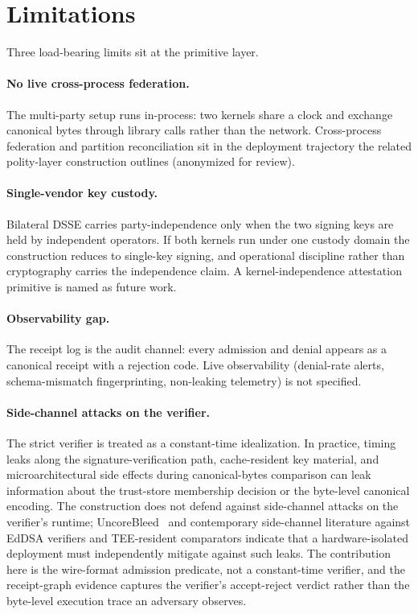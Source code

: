 \section{Limitations}
\label{sec:limits}

Three load-bearing limits sit at the primitive layer.

\paragraph{No live cross-process federation.} The multi-party setup runs in-process: two kernels share a clock and exchange canonical bytes through library calls rather than the network. Cross-process federation and partition reconciliation sit in the deployment trajectory the related polity-layer construction outlines (anonymized for review).

\paragraph{Single-vendor key custody.} Bilateral DSSE carries party-independence only when the two signing keys are held by independent operators. If both kernels run under one custody domain the construction reduces to single-key signing, and operational discipline rather than cryptography carries the independence claim. A kernel-independence attestation primitive is named as future work.

\paragraph{Observability gap.} The receipt log is the audit channel: every admission and denial appears as a canonical receipt with a rejection code. Live observability (denial-rate alerts, schema-mismatch fingerprinting, non-leaking telemetry) is not specified.

\paragraph{Side-channel attacks on the verifier.} The strict verifier is treated as a constant-time idealization. In practice, timing leaks along the signature-verification path, cache-resident key material, and microarchitectural side effects during canonical-bytes comparison can leak information about the trust-store membership decision or the byte-level canonical encoding. The construction does not defend against side-channel attacks on the verifier's runtime; UncoreBleed~\cite{uncoreBleed2026} and contemporary side-channel literature against EdDSA verifiers and TEE-resident comparators indicate that a hardware-isolated deployment must independently mitigate against such leaks. The contribution here is the wire-format admission predicate, not a constant-time verifier, and the receipt-graph evidence captures the verifier's accept-reject verdict rather than the byte-level execution trace an adversary observes.


